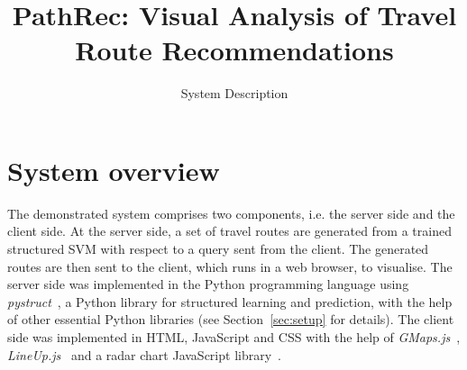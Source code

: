 \documentclass[sigconf]{acmart}
\begin{document}
\title{PathRec: Visual Analysis of Travel Route Recommendations}
\subtitle{System Description}
\maketitle

\thispagestyle{empty}

\section{System overview}
\label{sec:overview}
The demonstrated system comprises two components, i.e. the server side and the client side.
At the server side, a set of travel routes are generated from a trained structured SVM with respect to
a query sent from the client. 
The generated routes are then sent to the client, which runs in a web browser, to visualise.
The server side was implemented in the Python programming language using \textit{pystruct}~\cite{JMLR:v15:mueller14a},
a Python library for structured learning and prediction,
with the help of other essential Python libraries (see Section~\ref{sec:setup} for details).
The client side was implemented in HTML, JavaScript and CSS with the help of \textit{GMaps.js}~\cite{gmaps.js}, \textit{LineUp.js}~\cite{lineup.js} and a radar chart JavaScript library~\cite{radarchart.js}.


\end{document}
